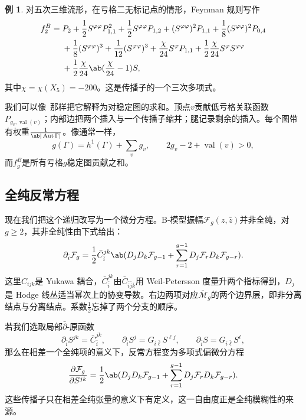 \documentclass{amsart}
\theoremstyle{definition}
\newtheorem{exm}[thm]{例}
\theoremstyle{remark}
\theoremstyle{plain}
\theoremstyle{definition}
\theoremstyle{remark}
\newcommand{\Mbar}{\overline{\mathcal{M}}}
\newcommand{\mc}[1]{\mathcal{#1}}
\newcommand{\on}[1]{\operatorname{#1}}
\newcommand{\1}{\mathbf{1}}
\newcommand{\2}{\mathbf{2}}
\newcommand{\3}{\mathbf{3}}
\DeclareMathOperator{\Aut}{Aut}
\begin{document}
\begin{exm}
    对五次三维流形，在亏格二无标记点的情形，Feynman 规则写作
    \begin{align*}
        f_2^B ={}& P_2 + \frac{1}{2}S^{\varphi\varphi}P_{1,1}^2 + \frac{1}{2}S^{\varphi\varphi}P_{1,2} + (S^{\varphi\varphi})^2 P_{1,1} + \frac{1}{8}(S^{\varphi\varphi})^2 P_{0,4} \\
        &+ \frac{1}{8}(S^{\varphi\varphi})^3 + \frac{1}{12}(S^{\varphi\varphi})^3 + \frac{\chi}{24}S^{\varphi}P_{1,1} + \frac{1}{2}\frac{\chi}{24}S^{\varphi}S^{\varphi\varphi} \\
        &+ \frac{1}{2}\frac{\chi}{24}\ab(\frac{\chi}{24}-1)S,
    \end{align*}
    其中\(\chi = \chi(X_5) = -200\)。这是传播子的一个三次多项式。
\end{exm}

我们可以像~那样把它解释为对稳定图的求和。顶点\(v\)贡献低亏格关联函数\(P_{g_v, \on{val}(v)}\)；内部边把两个插入与一个传播子缩并；腿记录剩余的插入。每个图带有权重\(\frac{1}{\ab|\Aut \Gamma|}\)。像通常一样，
\[ g(\Gamma) = h^1(\Gamma) + \sum_v g_v, \qquad 2g_v - 2 + \on{val}(v) > 0, \]
而\(f_g^B\)是所有亏格\(g\)稳定图贡献之和。

\subsection{全纯反常方程}%
\label{sub:The holomorphic anomaly equation}

现在我们把这个递归改写为一个微分方程。B-模型振幅\(\mc{F}_g(z,\bar{z})\)并非全纯，对\(g \geq 2\)，其非全纯性由下式给出：
\[ \partial_{\bar{i}} \mc{F}_g = \frac{1}{2}\bar{C}_{\bar{i}}^{jk}\ab( D_j D_k \mc{F}_{g-1} + \sum_{r=1}^{g-1} D_j \mc{F}_r D_k \mc{F}_{g-r} ). \]
这里\(C_{ijk}\)是 Yukawa 耦合，\(\bar{C}_{\bar{i}}^{jk}\)由\(\bar{C}_{\bar{i}\bar{j}\bar{k}}\)用 Weil-Petersson 度量升两个指标得到，\(D_j\)是 Hodge 线丛适当幂次上的协变导数。右边两项对应\(\Mbar_g\)的两个边界层，即非分离结点与分离结点。系数\(\frac{1}{2}\)忘掉了两个分支的顺序。

若我们选取局部\(\bar{\partial}\)-原函数
\[ \partial_{\bar{i}}S^{jk} = \bar{C}_{\bar{i}}^{jk}, \qquad \partial_{\bar{i}}S^j = G_{i\bar{\ell}}S^{\ell j}, \qquad \partial_{\bar{i}}S = G_{i\bar{\ell}}S^{\ell}, \]
那么在相差一个全纯项的意义下，反常方程变为多项式偏微分方程
\[ \pdv{\mc{F}_g}{S^{jk}} = \frac{1}{2}\ab( D_jD_k \mc{F}_{g-1} + \sum_{r=1}^{g-1} D_j \mc{F}_r D_k \mc{F}_{g-r} ). \]
这些传播子只在相差全纯张量的意义下有定义，这一自由度正是全纯模糊性的来源。
\end{document}
